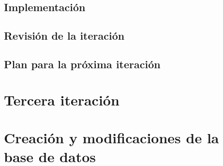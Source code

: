 \subsection{Implementación}

\subsection{Revisión de la iteración}

\subsection{Plan para la próxima iteración}

\section{Tercera iteración}

\section{Creación y modificaciones de la base de datos}

